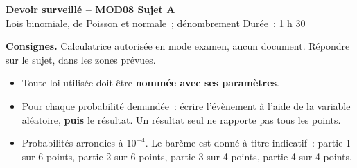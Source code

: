 \documentclass[a4paper,11pt]{article}
\begin{document}
\begin{tcolorbox}[colback=uimmred, colframe=uimmred, sharp corners, boxrule=0pt,
  left=14pt, right=14pt, top=10pt, bottom=10pt]
{\color{white}\LARGE\bfseries Devoir surveillé -- MOD08 \hfill Sujet A}\\[4pt]
{\color{white}\large Lois binomiale, de Poisson et normale~; dénombrement \hfill Durée~: 1 h 30}
\end{tcolorbox}

\vspace{4pt}

\begin{consigne}
\textbf{Consignes.} Calculatrice autorisée en mode examen, aucun document. Répondre sur le sujet, dans les zones prévues.
\begin{itemize}[leftmargin=12pt, itemsep=1pt, topsep=2pt]
  \item Toute loi utilisée doit être \textbf{nommée avec ses paramètres}.
  \item Pour chaque probabilité demandée~: écrire l'évènement à l'aide de la variable aléatoire, \textbf{puis} le résultat. Un résultat seul ne rapporte pas tous les points.
  \item Probabilités arrondies à $10^{-4}$. Le barème est donné à titre indicatif~: partie 1 sur 6 points, partie 2 sur 6 points, partie 3 sur 4 points, partie 4 sur 4 points.
\end{itemize}
\end{consigne}
\end{document}

